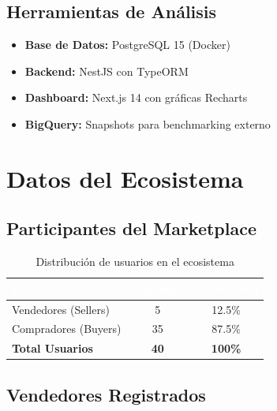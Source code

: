 \documentclass[12pt, a4paper]{article}
\begin{document}
\subsection{Herramientas de Análisis}
\begin{itemize}
    \item \textbf{Base de Datos:} PostgreSQL 15 (Docker)
    \item \textbf{Backend:} NestJS con TypeORM
    \item \textbf{Dashboard:} Next.js 14 con gráficas Recharts
    \item \textbf{BigQuery:} Snapshots para benchmarking externo
\end{itemize}

\section{Datos del Ecosistema}

\subsection{Participantes del Marketplace}

\begin{table}[H]
\centering
\caption{Distribución de usuarios en el ecosistema}
\begin{tabular}{l c c}
\toprule
\rowcolor{tableheader}
\textcolor{white}{\textbf{Rol}} & \textcolor{white}{\textbf{Cantidad}} & \textcolor{white}{\textbf{\% del Total}} \\
\midrule
Vendedores (Sellers) & 5 & 12.5\% \\
\rowcolor{rowalt}
Compradores (Buyers) & 35 & 87.5\% \\
\midrule
\textbf{Total Usuarios} & \textbf{40} & \textbf{100\%} \\
\bottomrule
\end{tabular}
\end{table}

\subsection{Vendedores Registrados}
\end{document}

